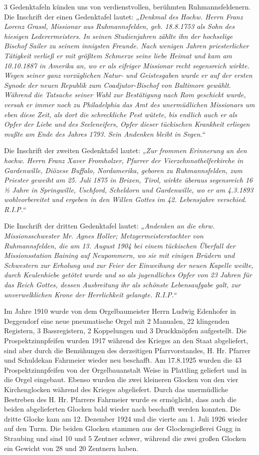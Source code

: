 \documentclass[12pt,a4paper]{book}
\begin{document}
3 Gedenktafeln künden uns von verdienstvollen, berühmten Ruhmannsfeldenern. Die
Inschrift der einen Gedenktafel lautet: \emph{„Denkmal des Hochw. Herrn Franz
Lorenz Grassl, Missionar aus Ruhmannsfelden, geb. 18.8.1753 als Sohn des
hiesigen Lederermeisters. In seinen Studienjahren zählte ihn der hochselige
Bischof Sailer zu seinem innigsten Freunde. Nach wenigen Jahren priesterlicher
Tätigkeit verließ er mit größtem Schmerze seine liebe Heimat und kam am
10.10.1887 in Amerika an, wo er als eifriger Missionar recht segensreich wirkte.
Wegen seiner ganz vorzüglichen Natur- und Geistesgaben wurde er auf der ersten
Synode der neuen Republik zum Coadjutor-Bischof von Baltimore gewählt. Während
die Tatsache seiner Wahl zur Bestätigung nach Rom geschickt wurde, versah er
immer noch zu Philadelphia das Amt des unermüdlichen Missionars um eben diese
Zeit, als dort die schreckliche Pest wütete, bis endlich auch er als Opfer der
Liebe und des Seeleneifers, Opfer dieser tückischen Krankheit erliegen mußte am
Ende des Jahres 1793. Sein Andenken bleibt in Segen.“}

Die Inschrift der zweiten Gedenktafel lautet: \emph{„Zur frommen Erinnerung an
den hochw. Herrn Franz Xaver Fromholzer, Pfarrer der Vierzehnnothelferkirche in
Gardenwille, Diözese Buffalo, Nordamerika, geboren zu Ruhmannsfelden, zum
Priester geweiht am 25. Juli 1875 in Brixen, Tirol, wirkte überaus segensreich
16 ½ Jahre in Springwille, Uschford, Scheldorn und Gardenwille, wo er am
4.3.1893 wohlvorbereitet und ergeben in den Willen Gottes im 42. Lebensjahre
verschied. R.I.P.“}

Die Inschrift der dritten Gedenktafel lautet: \emph{„Andenken an die ehrw.
Missionsschwester Mr. Agnes Holler; Metzgermeisterstochter von Ruhmannsfelden,
die am 13. August 1904 bei einem tückischen Überfall der Missionsstation Baining
auf Neupommern, wo sie mit einigen Brüdern und Schwestern zur Erholung und zur
Feier der Einweihung der neuen Kapelle weilte, durch Keulenhiebe getötet wurde
und so als jugendliches Opfer von 23 Jahren für das Reich Gottes, dessen
Ausbreitung ihr als schönste Lebensaufgabe galt, zur unverwelklichen Krone der
Herrlichkeit gelangte. R.I.P.“}

Im Jahre 1910 wurde von dem Orgelbaumeister Herrn Ludwig Edenhofer in Deggendorf
eine neue pneumatische Orgel mit 2 Manualen, 22 klingenden Registern, 3
Bassregistern, 2 Koppelungen und 3 Druckknöpfen aufgestellt. Die
Prospektzinnpfeifen wurden 1917 während des Krieges an den Staat abgeliefert,
sind aber durch die Bemühungen des derzeitigen Pfarrvorstandes, H. Hr. Pfarrer
und Schuldekan Fahrmeier wieder neu beschafft. Am 17.8.1925 wurden die 43
Prospektzinnpfeifen von der Orgelbauanstalt Weise in Plattling geliefert und in
die Orgel eingebaut. Ebenso wurden die zwei kleineren Glocken von den vier
Kirchenglocken während des Krieges abgeliefert. Durch das unermüdliche Bestreben
des H. Hr. Pfarrers Fahrmeier wurde es ermöglicht, dass auch die beiden
abgelieferten Glocken bald wieder nach beschafft werden konnten. Die dritte
Glocke kam am 12. Dezember 1924 und die vierte am 1. Juli 1926 wieder auf den
Turm. Die beiden Glocken stammen aus der Glockengießerei Gugg in Straubing und
sind 10 und 5 Zentner schwer, während die zwei großen Glocken ein Gewicht von 28
und 20 Zentnern haben.
\end{document}
